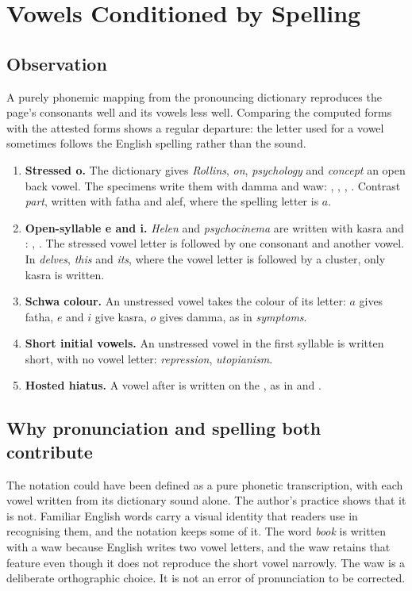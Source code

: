 \chapter{Vowels Conditioned by Spelling}\label{ch:vowels}

\section{Observation}
A purely phonemic mapping from the pronouncing dictionary reproduces the page's consonants well and its vowels less well. Comparing the computed forms with the attested forms shows a regular departure: the letter used for a vowel sometimes follows the English spelling rather than the sound.

\begin{enumerate}
\item \textbf{Stressed o.} The dictionary gives \emph{Rollins}, \emph{on}, \emph{psychology} and \emph{concept} an open back vowel. The specimens write them with damma and waw: , , , . Contrast \emph{part}, written  with fatha and alef, where the spelling letter is $a$.
\item \textbf{Open-syllable e and i.} \emph{Helen} and \emph{psychocinema} are written with kasra and : , . The stressed vowel letter is followed by one consonant and another vowel. In \emph{delves}, \emph{this} and \emph{its}, where the vowel letter is followed by a cluster, only kasra is written.
\item \textbf{Schwa colour.} An unstressed vowel takes the colour of its letter: $a$ gives fatha, $e$ and $i$ give kasra, $o$ gives damma, as in  \emph{symptoms}.
\item \textbf{Short initial vowels.} An unstressed vowel in the first syllable is written short, with no vowel letter:  \emph{repression},  \emph{utopianism}.
\item \textbf{Hosted hiatus.} A vowel after  is written on the , as in  and .
\end{enumerate}

\section{Why pronunciation and spelling both contribute}
The notation could have been defined as a pure phonetic transcription, with each vowel written from its dictionary sound alone. The author's practice shows that it is not. Familiar English words carry a visual identity that readers use in recognising them, and the notation keeps some of it. The word \emph{book} is written  with a waw because English writes two vowel letters, and the waw retains that feature even though it does not reproduce the short vowel narrowly. The waw is a deliberate orthographic choice. It is not an error of pronunciation to be corrected.

